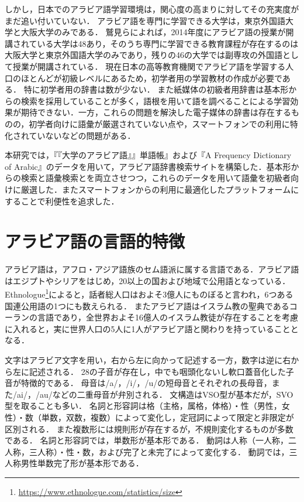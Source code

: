 \documentclass[technicalreport]{ieicej}
\begin{document}
しかし，日本でのアラビア語学習環境は，関心度の高まりに対してその充実度がまだ追い付いていない．
アラビア語を専門に学習できる大学は，東京外国語大学と大阪大学のみである．
鷲見\cite{washimi2016}らによれば，2014年度にアラビア語の授業が開講されている大学は48あり，そのうち専門に学習できる教育課程が存在するのは大阪大学と東京外国語大学のみであり，残りの46の大学では副専攻の外国語として授業が開講されている．
現在日本の高等教育機関でアラビア語を学習する人口のほとんどが初級レベルにあるため，初学者用の学習教材の作成が必要である．
特に初学者用の辞書は数が少ない．
また紙媒体の初級者用辞書は基本形からの検索を採用していることが多く，語根を用いて語を調べることによる学習効果が期待できない．一方，これらの問題を解決した電子媒体の辞書は存在するものの，初学者向けに語彙が厳選されていない点や，スマートフォンでの利用に特化されていないなどの問題がある．

本研究では，『『大学のアラビア語』』単語帳』および『A Frequency Dictionary of Arabic』のデータを用いて，アラビア語辞書検索サイトを構築した．基本形からの検索と語彙検索とを両立させつつ，これらのデータを用いて語彙を初級者向けに厳選した．またスマートフォンからの利用に最適化したプラットフォームにすることで利便性を追求した．

\section{アラビア語の言語的特徴}
アラビア語は，アフロ・アジア語族のセム語派に属する言語である．アラビア語はエジプトやシリアをはじめ，20以上の国および地域で公用語となっている．
Ethnologue\footnote{\url{https://www.ethnologue.com/statistics/size}}によると，話者総人口はおよそ3億人にものぼると言われ，6つある国連公用語の1つにも数えられる．
またアラビア語はイスラム教の聖典であるコーランの言語であり，全世界およそ16億人のイスラム教徒が存在することを考慮に入れると，実に世界人口の5人に1人がアラビア語と関わりを持っていることとなる．

文字はアラビア文字を用い，右から左に向かって記述する一方，数字は逆に右から左に記述される．
28の子音が存在し，中でも咽頭化ないし軟口蓋音化した子音が特徴的である．
母音は/a/，/i/，/u/の短母音とそれぞれの長母音，また/ai/，/au/などの二重母音が弁別される．
文構造はVSO型が基本だが，SVO型を取ることも多い．
名詞と形容詞は格（主格，属格，体格）・性（男性，女性）・数（単数，双数，複数）によって変化し，定冠詞によって限定と非限定が区別される．
また複数形には規則形が存在するが，不規則変化するものが多数である．
名詞と形容詞では，単数形が基本形である．
動詞は人称（一人称，二人称，三人称）・性・数，および完了と未完了によって変化する．
動詞では，三人称男性単数完了形が基本形である．
\end{document}

